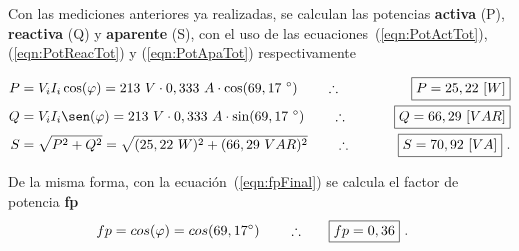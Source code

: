     Con las mediciones anteriores ya realizadas, se calculan las potencias \textbf{activa} (P), \textbf{reactiva} (Q)
    y \textbf{aparente} (S), con el uso de las ecuaciones~(\ref{eqn:PotActTot}), (\ref{eqn:PotReacTot}) y 
    (\ref{eqn:PotApaTot}) respectivamente

    \begin{align*}
      P &= V_i  I_i  \cos(\varphi) = 213\ V \cdot 0,333\ A \cdot \cos(69,17\ ^{\circ}) 
                                \hspace{20pt} \therefore \hspace{20pt} \Aboxed{P = 25,22\ [W]} \\
      Q &= V_i  I_i  \sen(\varphi) = 213\ V \cdot 0,333\ A \cdot \sin(69,17\ ^{\circ}) 
                                \hspace{20pt} \therefore \hspace{20pt} \Aboxed{Q = 66,29\ [VAR]} \\
      S &= \sqrt{P^2 + Q^2} =  \sqrt{(25,22\ W)^2 + (66,29\ VAR)^2}
                                \hspace{20pt} \therefore \hspace{20pt} \Aboxed{S = 70,92\ [VA]} \ .
    \end{align*}

    \noindent De la misma forma, con la ecuación~(\ref{eqn:fpFinal}) se calcula el factor de potencia \textbf{fp}
    \begin{align*}
      fp = cos(\varphi) = cos(69,17 ^{\circ}) \hspace{20pt} \therefore \hspace{20pt} \Aboxed{fp = 0,36}\ .
    \end{align*}



